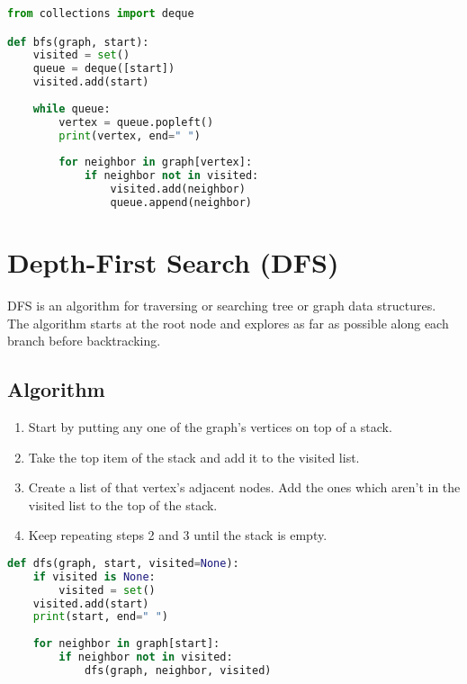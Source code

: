 \documentclass{article}
\begin{document}
\begin{lstlisting}[language=python]
from collections import deque

def bfs(graph, start):
    visited = set()
    queue = deque([start])
    visited.add(start)
    
    while queue:
        vertex = queue.popleft()
        print(vertex, end=" ")
        
        for neighbor in graph[vertex]:
            if neighbor not in visited:
                visited.add(neighbor)
                queue.append(neighbor)
\end{lstlisting}

\section{Depth-First Search (DFS)}

DFS is an algorithm for traversing or searching tree or graph data structures. The algorithm starts at the root node and explores as far as possible along each branch before backtracking.

\subsection{Algorithm}

\begin{enumerate}
  \item Start by putting any one of the graph's vertices on top of a stack.
  \item Take the top item of the stack and add it to the visited list.
  \item Create a list of that vertex's adjacent nodes. Add the ones which aren't in the visited list to the top of the stack.
  \item Keep repeating steps 2 and 3 until the stack is empty.
\end{enumerate}

\begin{lstlisting}[language=python]
def dfs(graph, start, visited=None):
    if visited is None:
        visited = set()
    visited.add(start)
    print(start, end=" ")
    
    for neighbor in graph[start]:
        if neighbor not in visited:
            dfs(graph, neighbor, visited)
\end{lstlisting}
\end{document}
